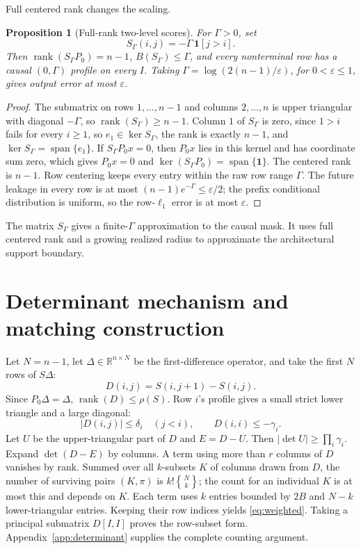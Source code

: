 \documentclass[10pt]{article}
\newtheorem{proposition}[theorem]{Proposition}
\theoremstyle{definition}
\DeclareMathOperator{\rank}{rank}
\newcommand{\R}{\mathbb R}
\newcommand{\one}{\mathbf 1}
\newcommand{\Stirling}[2]{\genfrac{\{}{\}}{0pt}{}{#1}{#2}}
\begin{document}
Full centered rank changes the scaling.

\begin{proposition}[Full-rank two-level scores]\label{prop:fullrank}
For \(\Gamma>0\), set
\[
 S_\Gamma(i,j)=-\Gamma\,\mathbf1[j>i].
\]
Then \(\rank(S_\Gamma P_0)=n-1\), \(B(S_\Gamma)\le\Gamma\), and every
nonterminal row has a causal \((0,\Gamma)\) profile on every \(I\).  Taking
\(\Gamma=\log(2(n-1)/\varepsilon)\), for \(0<\varepsilon\le1\), gives
output error at most \(\varepsilon\).
\end{proposition}

\begin{proof}
The submatrix on rows \(1,\ldots,n-1\) and columns \(2,\ldots,n\) is
upper triangular with diagonal \(-\Gamma\), so \(\rank(S_\Gamma)\ge n-1\).
Column \(1\) of \(S_\Gamma\) is zero, since \(1>i\) fails for every
\(i\ge1\), so \(e_1\in\ker S_\Gamma\), the rank is exactly \(n-1\), and
\(\ker S_\Gamma=\operatorname{span}\{e_1\}\).  If
\(S_\Gamma P_0x=0\), then \(P_0x\) lies in this kernel and has coordinate
sum zero, which gives \(P_0x=0\) and
\(\ker(S_\Gamma P_0)=\operatorname{span}\{\one\}\).  The centered rank is
\(n-1\).  Row centering keeps every
entry within the raw row range \(\Gamma\).  The future leakage in every row
is at most \((n-1)e^{-\Gamma}\le\varepsilon/2\); the prefix conditional
distribution is uniform, so the row-\(\ell_1\) error is at most
\(\varepsilon\).
\end{proof}

The matrix \(S_\Gamma\) gives a finite-\(\Gamma\) approximation to the causal
mask.  It uses full centered rank and a growing realized radius to approximate
the architectural support boundary.

\section{Determinant mechanism and matching construction}\label{sec:mechanism}

Let \(N=n-1\), let \(\Delta\in\R^{n\times N}\) be the first-difference
operator, and take the first \(N\) rows of \(S\Delta\):
\[
 D(i,j)=S(i,j+1)-S(i,j).
\]
Since \(P_0\Delta=\Delta\), \(\rank(D)\le\rho(S)\).  Row \(i\)'s profile
gives a small strict lower triangle and a large diagonal:
\[
 |D(i,j)|\le\delta_i\quad(j<i),\qquad
 D(i,i)\le-\gamma_i.
\]
Let \(U\) be the upper-triangular part of \(D\) and \(E=D-U\).  Then
\(|\det U|\ge\prod_i\gamma_i\).  Expand \(\det(D-E)\) by columns.  A term
using more than \(r\) columns of \(D\) vanishes by rank.  Summed over all
\(k\)-subsets \(K\) of columns drawn from \(D\), the number of surviving pairs
\((K,\pi)\) is \(k!\Stirling{N}{k}\); the count for an individual \(K\) is at
most this and depends on \(K\).  Each term uses \(k\) entries bounded by \(2B\) and
\(N-k\) lower-triangular entries.  Keeping their row indices yields
\eqref{eq:weighted}.  Taking a principal submatrix \(D[I,I]\) proves the
row-subset form.  Appendix~\ref{app:determinant} supplies the complete
counting argument.
\end{document}
